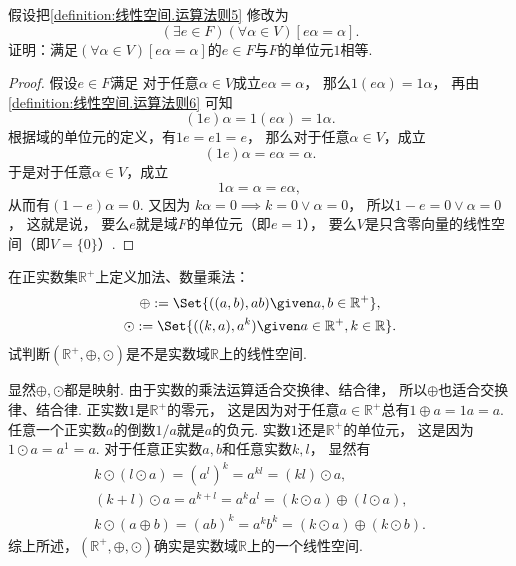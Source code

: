 \begin{example}
假设把\cref{definition:线性空间.运算法则5} 修改为\begin{equation*}
	(\exists e \in F)
	(\forall \alpha \in V)
	[
		e \alpha = \alpha
	].
\end{equation*}
证明：满足\(
	(\forall \alpha \in V)
	[
		e \alpha = \alpha
	]
\)的\(e \in F\)与\(F\)的单位元\(1\)相等.
\begin{proof}
假设\(e \in F\)满足
对于任意\(\alpha \in V\)成立\(e \alpha = \alpha\)，
那么\(1 (e \alpha) = 1 \alpha\)，
再由\cref{definition:线性空间.运算法则6} 可知\begin{equation*}
	(1 e) \alpha = 1 (e \alpha) = 1 \alpha.
\end{equation*}
根据域的单位元的定义，有\(1 e = e 1 = e\)，
那么对于任意\(\alpha \in V\)，成立\begin{equation*}
	(1 e) \alpha = e \alpha = \alpha.
\end{equation*}
于是对于任意\(\alpha \in V\)，成立\begin{equation*}
	1 \alpha = \alpha = e \alpha,
\end{equation*}
从而有\((1-e) \alpha = 0\).
又因为 \hyperref[theorem:线性空间.线性空间的结构.线性空间的性质5]{
\(
	k\alpha=0 \implies k=0 \lor \alpha=0
\)}，
所以\(1-e = 0 \lor \alpha = 0\)，
这就是说，
要么\(e\)就是域\(F\)的单位元（即\(e = 1\)），
要么\(V\)是只含零向量的线性空间（即\(V = \{0\}\)）.
\end{proof}
\end{example}

\begin{example}
在正实数集\(\mathbb{R}^+\)上定义加法、数量乘法：\begin{gather*}
	\oplus \defeq \Set{
		((a,b),ab)
		\given
		a,b \in \mathbb{R}^+
	}, \\
	\odot \defeq \Set{
		((k,a),a^k)
		\given
		a \in \mathbb{R}^+,
		k \in \mathbb{R}
	}.
\end{gather*}
试判断\((\mathbb{R}^+,\oplus,\odot)\)是不是实数域\(\mathbb{R}\)上的线性空间.
\begin{solution}
显然\(\oplus,\odot\)都是映射.
由于实数的乘法运算适合交换律、结合律，
所以\(\oplus\)也适合交换律、结合律.
正实数\(1\)是\(\mathbb{R}^+\)的零元，
这是因为对于任意\(a \in \mathbb{R}^+\)总有\(1 \oplus a = 1a = a\).
任意一个正实数\(a\)的倒数\(1/a\)就是\(a\)的负元.
实数\(1\)还是\(\mathbb{R}^+\)的单位元，
这是因为\(1 \odot a = a^1 = a\).
对于任意正实数\(a,b\)和任意实数\(k,l\)，
显然有\begin{gather*}
	k \odot (l \odot a)
	= (a^l)^k
	= a^{k l}
	= (kl) \odot a, \\
	(k+l) \odot a
	= a^{k+l}
	= a^k a^l
	= (k \odot a) \oplus (l \odot a), \\
	k \odot (a \oplus b)
	= (ab)^k
	= a^k b^k
	= (k \odot a) \oplus (k \odot b).
\end{gather*}
综上所述，\((\mathbb{R}^+,\oplus,\odot)\)确实是实数域\(\mathbb{R}\)上的一个线性空间.
\end{solution}
\end{example}

